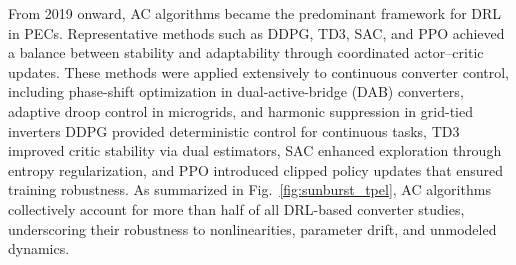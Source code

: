 From 2019 onward, AC algorithms became the predominant framework for DRL in PECs.  
Representative methods such as DDPG, TD3, SAC, and PPO achieved a balance between stability and adaptability through coordinated actor--critic updates.  
These methods were applied extensively to continuous converter control, including phase-shift optimization in dual-active-bridge (DAB) converters, adaptive droop control in microgrids, and harmonic suppression in grid-tied inverters
DDPG provided deterministic control for continuous tasks, TD3 improved critic stability via dual estimators, SAC enhanced exploration through entropy regularization, and PPO introduced clipped policy updates that ensured training robustness.  
As summarized in Fig.~\ref{fig:sunburst_tpel}, AC algorithms collectively account for more than half of all DRL-based converter studies, underscoring their robustness to nonlinearities, parameter drift, and unmodeled dynamics.


